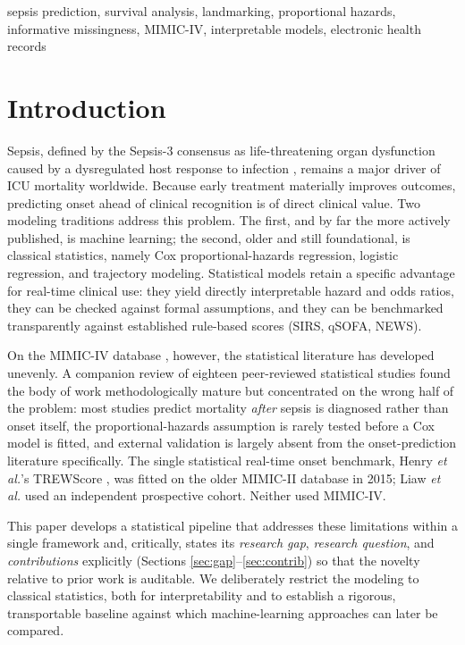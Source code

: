 \documentclass[conference]{IEEEtran}
\begin{document}
\begin{IEEEkeywords}
sepsis prediction, survival analysis, landmarking, proportional hazards,
informative missingness, MIMIC-IV, interpretable models, electronic health
records
\end{IEEEkeywords}

\section{Introduction}
Sepsis, defined by the Sepsis-3 consensus as life-threatening organ
dysfunction caused by a dysregulated host response to infection
\cite{singer2016sepsis3}, remains a major driver of ICU mortality worldwide.
Because early treatment materially improves outcomes, predicting onset ahead of
clinical recognition is of direct clinical value. Two modeling traditions
address this problem. The first, and by far the more actively published, is
machine learning; the second, older and still foundational, is classical
statistics, namely Cox proportional-hazards regression, logistic regression, and
trajectory modeling. Statistical models retain a specific advantage for
real-time clinical use: they yield directly interpretable hazard and odds
ratios, they can be checked against formal assumptions, and they can be
benchmarked transparently against established rule-based scores (SIRS, qSOFA,
NEWS).

On the MIMIC-IV database \cite{johnson2023mimiciv}, however, the statistical
literature has developed unevenly. A companion review of eighteen peer-reviewed
statistical studies found the body of work methodologically mature but
concentrated on the wrong half of the problem: most studies predict mortality
\emph{after} sepsis is diagnosed rather than onset itself, the
proportional-hazards assumption is rarely tested before a Cox model is fitted,
and external validation is largely absent from the onset-prediction literature
specifically. The single statistical real-time onset benchmark, Henry
\emph{et al.}'s TREWScore \cite{henry2015trewscore}, was fitted on the older
MIMIC-II database in 2015; Liaw \emph{et al.} \cite{liaw2019mortality} used an
independent prospective cohort. Neither used MIMIC-IV.

This paper develops a statistical pipeline that addresses these limitations
within a single framework and, critically, states its \emph{research gap},
\emph{research question}, and \emph{contributions} explicitly (Sections
\ref{sec:gap}--\ref{sec:contrib}) so that the novelty relative to prior work is
auditable. We deliberately restrict the modeling to classical statistics, both
for interpretability and to establish a rigorous, transportable baseline
against which machine-learning approaches can later be compared.
\end{document}
